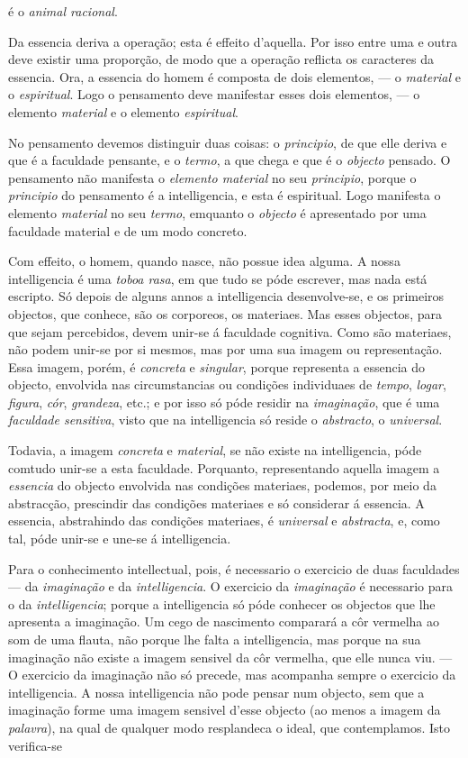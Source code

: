 é o \emph{animal racional}.\par Da essencia deriva a operação; esta é effeito d'aquella. Por isso entre uma e outra deve existir uma proporção, de modo que a operação reflicta os caracteres da essencia. Ora, a essencia do homem é composta de dois elementos, --- o \emph{material} e o \emph{espiritual}. Logo o pensamento deve manifestar esses dois elementos, --- o elemento \emph{material} e o elemento \emph{espiritual}.\par No pensamento devemos distinguir duas coisas: o \emph{principio}, de que elle deriva e que é a faculdade pensante, e o \emph{termo}, a que chega e que é o \emph{objecto} pensado. O pensamento não manifesta o \emph{elemento material} no seu \emph{principio}, porque o \emph{principio} do pensamento é a intelligencia, e esta é espiritual. Logo manifesta o elemento \emph{material} no seu \emph{termo}, emquanto o \emph{objecto} é apresentado por uma faculdade material e de um modo concreto.\par Com effeito, o homem, quando nasce, não possue idea alguma. A nossa intelligencia é uma \emph{toboa rasa}, em que tudo se póde escrever, mas nada está escripto. Só depois de alguns annos a intelligencia desenvolve-se, e os primeiros objectos, que conhece, são os corporeos, os materiaes. Mas esses objectos, para que sejam percebidos, devem unir-se á faculdade cognitiva. Como são materiaes, não podem unir-se por si mesmos, mas por uma sua imagem ou representação. Essa imagem, porém, é \emph{concreta} e \emph{singular}, porque representa a essencia do objecto, envolvida nas circumstancias ou condições individuaes de \emph{tempo}, \emph{logar}, \emph{figura}, \emph{cór}, \emph{grandeza}, etc.; e por isso só póde residir na \emph{imaginação}, que é uma \emph{faculdade sensitiva}, visto que na intelligencia só reside o \emph{abstracto}, o \emph{universal}.\par Todavia, a imagem \emph{concreta} e \emph{material}, se não existe na intelligencia, póde comtudo unir-se a esta faculdade. Porquanto, representando aquella imagem a \emph{essencia} do objecto envolvida nas condições materiaes, podemos, por meio da abstracção, prescindir das condições materiaes e só considerar á essencia. A essencia, abstrahindo das condições materiaes, é \emph{universal} e \emph{abstracta}, e, como tal, póde unir-se e une-se á intelligencia.\par Para o conhecimento intellectual, pois, é necessario o exercicio de duas faculdades --- da \emph{imaginação} e da \emph{intelligencia}. O exercicio da \emph{imaginação} é necessario para o da \emph{intelligencia}; porque a intelligencia só póde conhecer os objectos que lhe apresenta a imaginação. Um cego de nascimento comparará a côr vermelha ao som de uma flauta, não porque lhe falta a intelligencia, mas porque na sua imaginação não existe a imagem sensivel da côr vermelha, que elle nunca viu. --- O exercicio da imaginação não só precede, mas acompanha sempre o exercicio da intelligencia. A nossa intelligencia não pode pensar num objecto, sem que a imaginação forme uma imagem sensivel d'esse objecto (ao menos a imagem da \emph{palavra}), na qual de qualquer modo resplandeca o ideal, que contemplamos. Isto verifica-se 